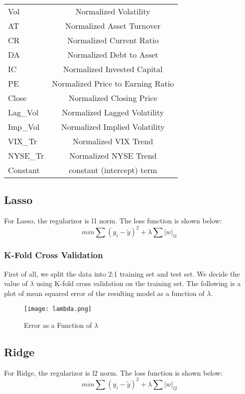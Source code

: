\documentclass[b4paper]{article}
\begin{document}
\begin{center}
\begin{tabular}{ l | c  }
 \hline
Vol & Normalized Volatility\\
AT & Normalized Asset Turnover\\
CR & Normalized Current Ratio\\
DA & Normalized Debt to Asset\\
IC & Normalized Invested Capital\\
PE & Normalized Price to Earning Ratio\\
Close & Normalized Closing Price\\
Lag\_Vol & Normalized Lagged Volatility\\
Imp\_Vol & Normalized Implied Volatility\\
VIX\_Tr & Normalized VIX Trend\\
NYSE\_Tr & Normalized NYSE Trend\\
Constant & constant (intercept) term\\
\hline
 \end{tabular}
\end{center}   

\subsection{Lasso}
For Lasso, the regularizor is l1 norm. The loss function is shown below:
\begin{equation}
min \sum (y_i - \widetilde{y})^2 + \lambda \sum |w|_{l1}
\end{equation}

\subsubsection{K-Fold Cross Validation}
First of all, we split the data into 2:1 training set and test set. We decide the value of $\lambda$ using K-fold cross validation on the training set. The following is a plot of mean squared error of the resulting model as a function of $\lambda$.

\begin{figure}[h]
\centering
\texttt{[image: lambda.png]}
\caption{\label{fig:lambda}Error as a Function of $\lambda$}
\end{figure}

\subsection{Ridge}
For Ridge, the regularizor is l2 norm. The loss function is shown below:
\begin{equation}
min \sum (y_i - \widetilde{y})^2 + \lambda \sum |w|_{l2}
\end{equation}
\end{document}
